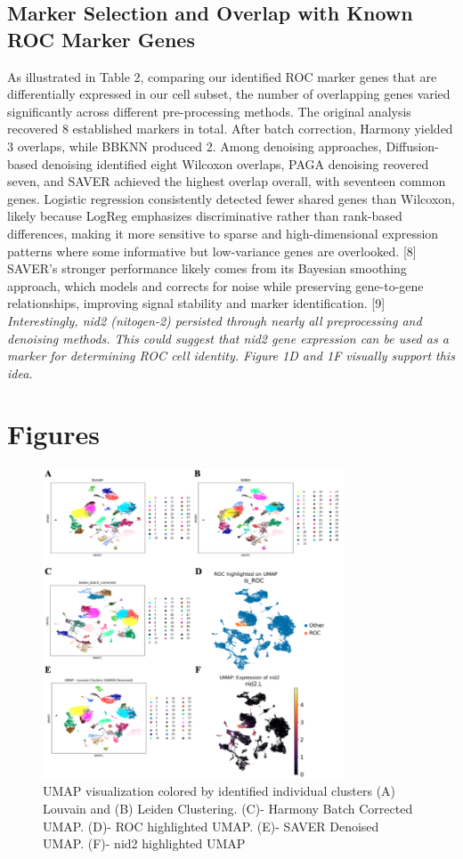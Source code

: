 \documentclass[11pt]{article}
\begin{document}
\subsection{Marker Selection and Overlap with Known ROC Marker Genes}
As illustrated in Table 2, comparing our identified ROC marker genes that are differentially expressed in our cell subset, the number of overlapping genes varied significantly across different pre-processing methods. The original analysis recovered 8 established markers in total. After batch correction, Harmony yielded 3 overlaps, while BBKNN produced 2. Among denoising approaches, Diffusion-based denoising identified eight Wilcoxon overlaps, PAGA denoising reovered seven, and SAVER achieved the highest overlap overall, with seventeen common genes. Logistic regression consistently detected fewer shared genes than Wilcoxon, likely because LogReg emphasizes discriminative rather than rank-based differences, making it more sensitive to sparse and high-dimensional expression patterns where some informative but low-variance genes are overlooked. [8] SAVER's stronger performance likely comes from its Bayesian smoothing approach, which models and corrects for noise while preserving gene-to-gene relationships, improving signal stability and marker identification. [9] \textit{Interestingly, nid2 (nitogen-2) persisted through nearly all preprocessing and denoising methods. This could suggest that nid2 gene expression can be used as a marker for determining ROC cell identity. Figure 1D and 1F visually support this idea.}

\section{Figures}
\begin{figure}[h]
    \centering
    \includegraphics[width=0.8\textwidth]{figure1A.png}
    \caption{UMAP visualization colored by identified individual clusters (A) Louvain and (B) Leiden Clustering. (C)- Harmony Batch Corrected UMAP. (D)- ROC highlighted UMAP. (E)- SAVER Denoised UMAP. (F)- nid2 highlighted UMAP}
    \label{fig:umap}
\end{figure}
\end{document}
